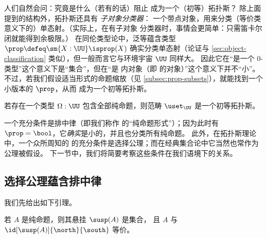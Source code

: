人们自然会问：究竟是什么（若有的话）阻止 \uset 成为一个（初等）拓扑斯？
除上面提到的结构外，拓扑斯还具有
\emph{子对象分类器}：
%
%
%
一个带点对象，用来分类（等价类意义下的）单态射。（实际上，在有子对象
分类器时，事情会更简单：只需笛卡尔闭就能得到余极限。）
在同伦类型论中，泛等蕴含类型 $\prop \defeq \sm{X:\UU}\isprop(X)$ 确实分类单态射（论证与 \cref{sec:object-classification} 类似），但一般而言它与环境宇宙 $\UU$ 同样大。
因此它在“是一个 $0$-类型”这个意义下是“集合”，但在“是 \UU 内对象（即 \uset 的对象）”这个意义下并不“小”。
不过，若我们假设适当形式的命题缩放（见 \cref{subsec:prop-subsets}），就能找到一个小版本的 $\prop$，从而 \uset 成为一个初等拓扑斯。

\begin{thm}\label{thm:settopos}
  若存在一个类型 $\Omega:\UU$ 包含全部纯命题，则范畴 $\uset_\UU$ 是一个初等拓扑斯。
\end{thm}

一个充分条件是排中律（即我们称作 \LEM{} 的“纯命题形式”）；因为此时有 $\prop = \bool$，它\emph{确实}是小的，并且也分类所有纯命题。
此外，在拓扑斯理论中，一个众所周知的 \LEM{} 的充分条件是选择公理；而在经典集合论中它当然也常作为公理被假设。
下一节中，我们将简要考察这些条件在我们语境下的关系。

%

\subsection{选择公理蕴含排中律}
\label{subsec:emacinsets}


我们先给出如下引理。

\begin{lem}\label{prop:trunc_of_prop_is_set}
若 $A$ 是纯命题，则其悬挂 $\susp(A)$ 是集合，
且 $A$ 与 $\id[\susp(A)]{\north}{\south}$ 等价。
\end{lem}

